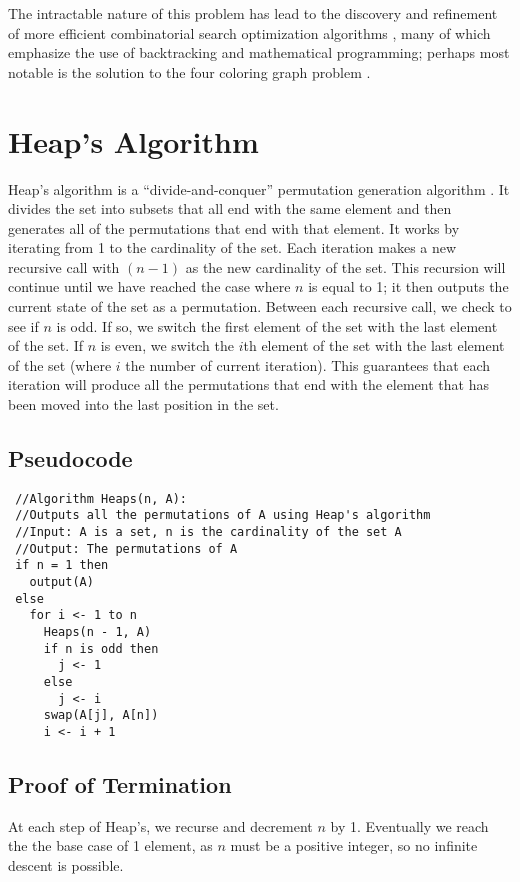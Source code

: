 \documentclass[10pt, oneside]{article}   	%
\begin{document}
The intractable nature of this problem has lead to the discovery and refinement of more efficient combinatorial search optimization algorithms \cite{sedgewick}, many of which emphasize the use of backtracking and mathematical programming; perhaps most notable is the solution to the four coloring graph problem \cite{lehmer}.  

\section{Heap's Algorithm}
Heap's algorithm is a ``divide-and-conquer'' permutation generation algorithm \cite{heap}. It divides the set into subsets that all end with the same element and then generates all of the permutations that end with that element. It works by iterating from 1 to the cardinality of the set. Each iteration makes a new recursive call with $(n - 1)$ as the new cardinality of the set. This recursion will continue until we have reached the case where $n$ is equal to 1; it then outputs the current state of the set as a permutation. Between each recursive call, we check to see if $n$ is odd. If so, we switch the first element of the set with the last element of the set. If $n$ is even, we switch the $i$th element of the set with the last element of the set (where $i$ the number of current iteration). This guarantees that each iteration will produce all the permutations that end with the element that has been moved into the last position in the set.

\subsection{Pseudocode}
\begin{verbatim}
 //Algorithm Heaps(n, A):
 //Outputs all the permutations of A using Heap's algorithm
 //Input: A is a set, n is the cardinality of the set A
 //Output: The permutations of A
 if n = 1 then
   output(A)
 else
   for i <- 1 to n
     Heaps(n - 1, A)
     if n is odd then
       j <- 1
     else
       j <- i
     swap(A[j], A[n])
     i <- i + 1
\end{verbatim}

\subsection{Proof of Termination}

At each step of Heap's, we recurse and decrement $n$ by 1. Eventually we reach the the base case of 1 element, as $n$ must be a positive integer, so no infinite descent is possible.
\end{document}
